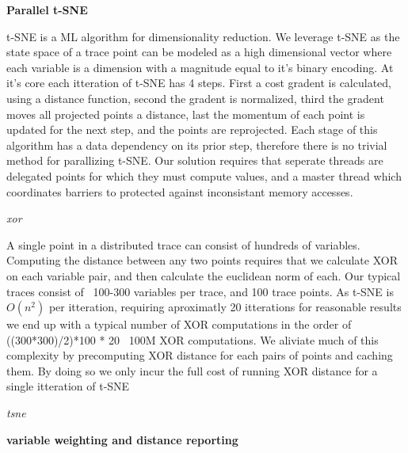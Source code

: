 \textbf{Parallel t-SNE}

t-SNE is a ML algorithm for dimensionality reduction. We leverage t-SNE as the
state space of a trace point can be modeled as a high dimensional vector where
each variable is a dimension with a magnitude equal to it's binary encoding. At
it's core each itteration of t-SNE has 4 steps. First a cost gradent is
calculated, using a distance function, second the gradent is normalized, third
the gradent moves all projected points a distance, last the momentum of each
point is updated for the next step, and the points are reprojected. Each stage
of this algorithm has a data dependency on its prior step, therefore there is
no trivial method for parallizing t-SNE. Our solution requires that seperate
threads are delegated points for which they must compute values, and a master
thread which coordinates barriers to protected against inconsistant memory
accesses.

\emph{xor}

A single point in a distributed trace can consist of hundreds of variables.
Computing the distance between any two points requires that we calculate XOR on
each variable pair, and then calculate the euclidean norm of each. Our typical
traces consist of ~100-300 variables per trace, and 100 trace points. As t-SNE
is $O(n^2)$ per itteration, requiring aproximatly 20 itterations for reasonable
results we end up with a typical number of XOR computations in the order of
((300*300)/2)*100 * 20 ~100M XOR computations. We aliviate much of this
complexity by precomputing XOR distance for each pairs of points and caching
them. By doing so we only incur the full cost of running XOR distance for a
single itteration of t-SNE

\emph{tsne}

\textbf{variable weighting and distance reporting}


